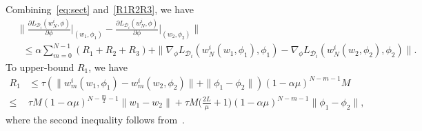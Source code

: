 \documentclass{osudissert96}
\begin{document}
Combining~\cref{eq:sect} and~\cref{R1R2R3}, we have  
\begin{align}\label{eq:initllls}
&\Big\|\frac{\partial L_{\mathcal{D}_i}( w^i_N, \phi)}{\partial \phi}\Big |_{(w_1,\phi_1)}  - \frac{\partial L_{\mathcal{D}_i}( w^i_N, \phi)}{\partial \phi} \Big |_{(w_2,\phi_2)}\Big\| \nonumber
\\&\;\;\leq \alpha\sum_{m=0}^{N-1}(R_1+R_2+R_3) +\|\nabla_\phi L_{\mathcal{D}_i}(w_{N}^i(w_1,\phi_1),\phi_1)-\nabla_\phi L_{\mathcal{D}_i}(w_{N}^i(w_2,\phi_2),\phi_2)\|.
\end{align}
To upper-bound $R_1$, we have 
\begin{align}\label{sR1}
R_1&\leq \tau (\|w_m^i(w_1,\phi_1)-w_m^i(w_2,\phi_2)\| + \|\phi_1-\phi_2\|) (1-\alpha \mu)^{N-m-1} M \nonumber
\\\leq& \tau M(1-\alpha\mu)^{N-\frac{m}{2}-1}  \|w_1-w_2\| + \tau M\Big(\frac{2L}{\mu}+1\Big) (1-\alpha \mu)^{N-m-1}\|\phi_1-\phi_2\|,
\end{align}
where the second inequality follows from~. 
 
\end{document}
